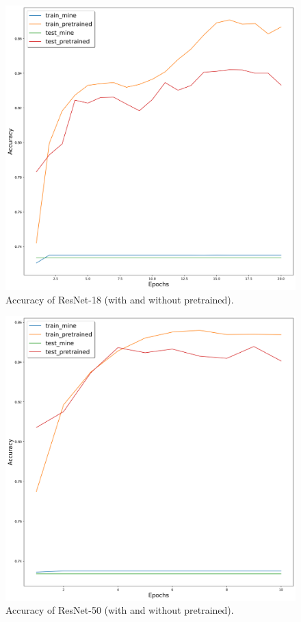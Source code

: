 	\begin{figure}[H]
		\centering
		\includegraphics[scale=0.3]{img/resnet18_acc.png}
		\caption{Accuracy of ResNet-18 (with and without pretrained).}
		\label{resnet18-acc}
	\end{figure}
	\begin{figure}[H]
		\centering
		\includegraphics[scale=0.3]{img/resnet50_acc.png}
		\caption{Accuracy of ResNet-50 (with and without pretrained).}
		\label{resnet50-acc}
	\end{figure}

